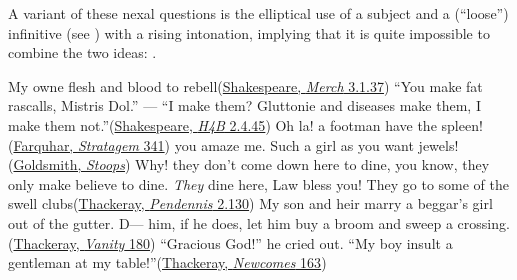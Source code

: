 A variant of these nexal questions is the elliptical use of a subject and a (``loose'') %
infinitive (see \cite[\href{https://archive.org/details/progressinlangua00jespuoft/page/204/mode/2up?view=theater}{§164f}]{jespersen1894progress}) %
with a rising intonation, implying that it is quite impossible to combine the two ideas: .

\ea \label{ex:04-17}
\ea
My owne flesh and blood to rebell\hfill(\href{https://internetshakespeare.uvic.ca/doc/MV_F1/scene/3.1/index.html#tln-1245}{Shakespeare, \textit{Merch} 3.1.37}) %
\ex
``You make fat rascalls, Mistris Dol.'' --- ``I make them? Gluttonie and diseases make them, I make them not.''\hfill(\href{https://internetshakespeare.uvic.ca/doc/2H4_F1/scene/2.4/index.html#tln-1065}{Shakespeare, \textit{H4B} 2.4.45}) 
\ex
Oh la! a footman have the spleen!\hfill(\href{https://archive.org/details/beauxstratagema00fitzgoog/page/n81/mode/2up?q=\%22Oh+la%21+a+footman+have+the+spleen\%22&view=theater}{Farquhar, \textit{Stratagem} 341}) %
\ex
you amaze me. Such a girl as you want jewels!\hfill(\href{https://archive.org/details/shestoopstoconqu03gold/page/68/mode/2up?q=\%22Such+a+girl+as+you+want+jewels\%22&view=theater}{Goldsmith, \textit{Stoops}})
\ex
Why! they don't come down here to dine, you know, they only make believe to dine. \textit{They} dine here, Law bless you! They go to some of the swell clubs\hfill(\href{https://archive.org/details/dli.ministry.14127/page/285/mode/2up?q=\%22dine+you+know\%22&view=theater}{Thackeray, \textit{Pendennis} 2.130}) %
\ex
My son and heir marry a beggar's girl out of the gutter. D--- him, if he does, let him buy a broom and sweep a crossing.\\\hfill(\href{https://archive.org/details/vanityfairanove03thacgoog/page/n111/mode/2up?q=\%22My+son+and+heir+marry+a\%22&view=theater}{Thackeray, \textit{Vanity} 180}) %
\ex
``Gracious God!'' he cried out. ``My boy insult a gentleman at my table!''\hfill(\href{https://archive.org/details/newcomes00unkngoog/page/n164/mode/2up?q=\%22my+boy+insult+a+gentleman+at+my+table\%22&view=theater}{Thackeray, \textit{Newcomes} 163}) %
